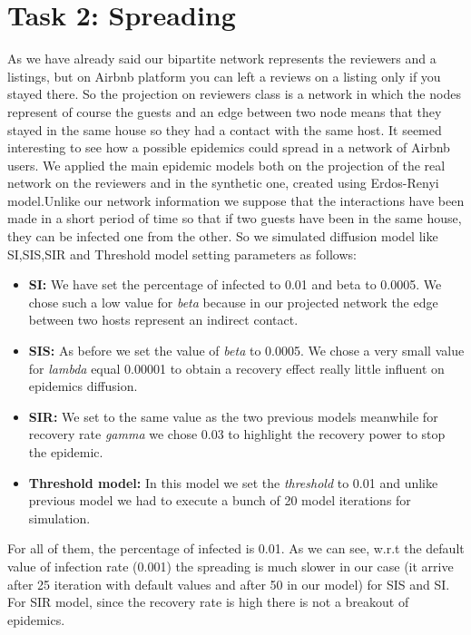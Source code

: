 \documentclass[sigchi]{acmart}
\begin{document}
\section{Task 2: Spreading} \label{sec5}
As we have already said our bipartite network represents the reviewers and a listings, but on Airbnb platform you can left a reviews on a listing only if you stayed there. So the projection on reviewers class is a network in which the nodes represent of course the guests and an edge between two node means that they stayed in the same house so they had a contact with the same host. \newline
It seemed interesting to see how a possible epidemics could spread in a network of Airbnb users. 
We applied the main epidemic models both on the projection of the real network on the reviewers and in the synthetic one, created using Erdos-Renyi model.\newline Unlike our network information we suppose that the interactions have been made in a short period of time so that if two guests have been in the same house, they can be infected one from the other.\newline
So we simulated diffusion model like SI,SIS,SIR and  Threshold model setting parameters as follows:
\begin{itemize}
    \item \textbf{SI:} We have set the percentage of infected to 0.01 and beta to 0.0005. We chose such a low value for \textit{beta} because in our projected network the edge between two hosts represent an indirect contact.
    \item \textbf{SIS:} As before we set the value of \textit{beta} to 0.0005. We chose a very small value for \textit{lambda} equal 0.00001 to obtain a recovery effect really little influent on epidemics diffusion.
    \item \textbf{SIR:} We set  to the same value as the two previous models meanwhile for recovery rate \textit{gamma} we chose 0.03 to highlight the recovery power to stop the epidemic.
    \item \textbf{Threshold model:} In this model we set the  \textit{threshold} to 0.01 and unlike previous model we had to execute a bunch of 20 model iterations for simulation.
\end{itemize}
For all of them, the percentage of infected is 0.01.
As we can see, w.r.t the default value of infection rate (0.001) the spreading is much slower in our case (it arrive after 25 iteration with default values and after 50 in our model) for SIS and SI. For SIR model, since the recovery rate is high there is not a breakout of epidemics. 
\end{document}
